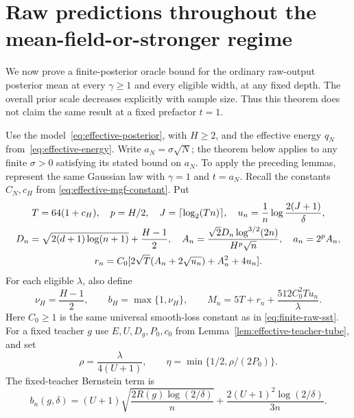 \section{Raw predictions throughout the mean-field-or-stronger regime}
\label{sec:raw-all-scales}

We now prove a finite-posterior oracle bound for the ordinary raw-output
posterior mean at every $\gamma\geq1$ and every eligible width, at any
fixed depth.  The overall prior scale decreases explicitly with sample
size.  Thus this theorem does not claim the same result at a fixed
prefactor $t=1$.

Use the model~\eqref{eq:effective-posterior}, with $H\geq2$, and the
effective energy $q_N$ from~\eqref{eq:effective-energy}.  Write
$a_N=\sigma\sqrt N$; the theorem below applies to any finite
$\sigma>0$ satisfying its stated bound on $a_N$.  To apply the preceding
lemmas, represent the same Gaussian law with $\gamma=1$ and $t=a_N$.
Recall the constants
$C_N,c_H$ from
\eqref{eq:effective-mgf-constant}.  Put
\begin{gather}
 T=64(1+c_H),\quad p=H/2,\quad J=\lceil\log_2(Tn)\rceil,
 \quad u_n=\frac1n\log\frac{2(J+1)}\delta,\notag\\
 D_n=\sqrt{2(d+1)\log(n+1)}+\frac{H-1}{2},\quad
 A_n=\frac{\sqrt2D_n\log^{3/2}(2n)}{H^p\sqrt n},\quad a_n=2^pA_n,
 \notag\\
 r_n=C_0[2\sqrt T(A_n+2\sqrt{u_n})+A_n^2+4u_n].
 \label{eq:raw-all-statistics}
\end{gather}
For each eligible $\lambda$, also define
\begin{equation}
 \nu_H=\frac{H-1}{2},\qquad b_H=\max\{1,\nu_H\},\qquad
 M_n=5T+r_n+\frac{512C_0^2Tu_n}{\lambda}.
 \label{eq:raw-all-risk-budget}
\end{equation}
Here $C_0\geq1$ is the same universal smooth-loss constant as in
\eqref{eq:finite-raw-sst}.  For a fixed teacher $g$ use $E,U,D_g,P_0,c_0$
from Lemma~\ref{lem:effective-teacher-tube}, and set
\[
 \rho=\frac\lambda{4(U+1)},\qquad
 \eta=\min\{1/2,\rho/(2P_0)\}.
\]
The fixed-teacher Bernstein term is
\[
 b_n(g,\delta)=(U+1)\sqrt{\frac{2R(g)\log(2/\delta)}n}
        +\frac{2(U+1)^2\log(2/\delta)}{3n}.
\]

